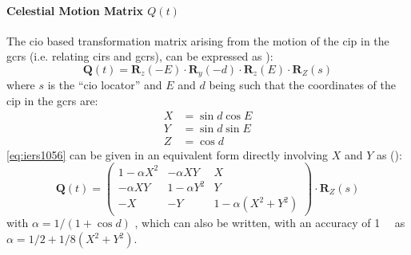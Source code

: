 \paragraph{Celestial Motion Matrix $Q(t)$}\label{par:celestial-motion-matrix}
The \gls{cio} based transformation matrix arising from the motion of the \gls{cip} 
in the \gls{gcrs} (i.e. relating \gls{cirs} and \gls{gcrs}), can be expressed as
\cite{iers2010}):
\begin{equation}
  \bm{Q}(t) = \bm{R}_z (-E) \cdot 
              \bm{R}_y (-d) \cdot 
              \bm{R}_z (E) \cdot 
              \bm{R}_Z (s)
  \label{eq:iers1056}
\end{equation}
where $s$ is the ``\gls{cio} locator'' and $E$ and $d$ being such that the 
coordinates of the \gls{cip} in the \gls{gcrs} are:
\begin{equation}
  \begin{aligned}
    X & = \sin{d} \cos{E} \\
    Y & = \sin{d} \sin{E} \\
    Z & = \cos{d}
  \end{aligned}
\end{equation}
\ref{eq:iers1056} can be given in an equivalent form directly involving $X$ and 
$Y$ as (\cite{iers2010}):
\begin{equation}
  \bm{Q}(t) = \begin{pmatrix}
    1-\alpha X^2 & -\alpha XY & X \\
    -\alpha XY & 1-\alpha Y^2 & Y \\
    -X & -Y & 1-\alpha (X^2 + Y^2) \end{pmatrix}
    \cdot \bm{R}_Z (s)
    \label{eq:iers10510}
\end{equation}
with $\alpha = 1/(1+\cos{d})$ , which can also be written, with an accuracy of 
\SI{1}{\micro\larcsecond} as $\alpha = 1/2 + 1/8(X^2 + Y^2)$.

